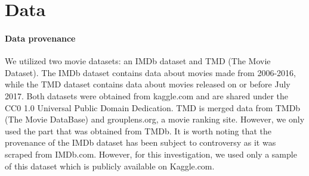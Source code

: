 \section{Data}

    \paragraph{Data provenance}
        We utilized two movie datasets: an IMDb dataset\cite{data:IMDb} and
            TMD\cite{data:TMD} (The Movie Dataset).
        The IMDb dataset contains data about movies made from 2006-2016, while the TMD
            dataset contains data about movies released on or before July 2017.
        Both datasets were obtained from kaggle.com and are shared under the CC0 1.0
            Universal Public Domain Dedication.
        TMD is merged data from TMDb (The Movie DataBase) and grouplens.org, a movie
            ranking site.
        However, we only used the part that was obtained from TMDb.
        It is worth noting that the provenance of the IMDb dataset has been subject to
            controversy as it was scraped from IMDb.com. 
        However, for this investigation, we used only a sample of this dataset which is publicly
            available on Kaggle.com.

